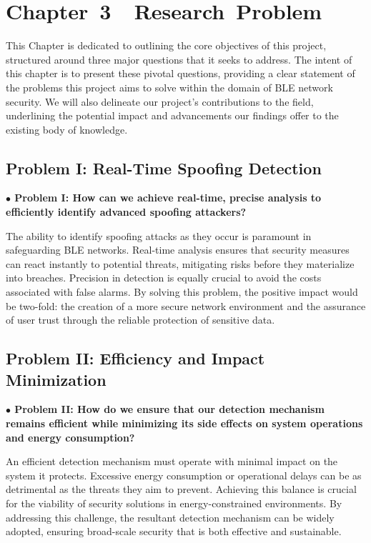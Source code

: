 \section*{Chapter~3~~Research~Problem}
\setcounter{section}{3} \setcounter{subsection}{0} 
\setcounter{table}{0} \setcounter{figure}{0} \setcounter{equation}{0}\setcounter{definition}{0}

\noindent This Chapter is dedicated to outlining the core objectives of this project, structured around three major questions that it seeks to address. The intent of this chapter is to present these pivotal questions, providing a clear statement of the problems this project aims to solve within the domain of BLE network security. We will also delineate our project's contributions to the field, underlining the potential impact and advancements our findings offer to the existing body of knowledge.

\subsection{Problem I: Real-Time Spoofing Detection}

\noindent \textbf{$\bullet$ Problem I: How can we achieve real-time, precise analysis to efficiently identify advanced spoofing attackers?}

The ability to identify spoofing attacks as they occur is paramount in safeguarding BLE networks. Real-time analysis ensures that security measures can react instantly to potential threats, mitigating risks before they materialize into breaches. Precision in detection is equally crucial to avoid the costs associated with false alarms. By solving this problem, the positive impact would be two-fold: the creation of a more secure network environment and the assurance of user trust through the reliable protection of sensitive data.

\subsection{Problem II: Efficiency and Impact Minimization}

\noindent \textbf{$\bullet$ Problem II: How do we ensure that our detection mechanism remains efficient while minimizing its side effects on system operations and energy consumption?}

An efficient detection mechanism must operate with minimal impact on the system it protects. Excessive energy consumption or operational delays can be as detrimental as the threats they aim to prevent. Achieving this balance is crucial for the viability of security solutions in energy-constrained environments. By addressing this challenge, the resultant detection mechanism can be widely adopted, ensuring broad-scale security that is both effective and sustainable.


